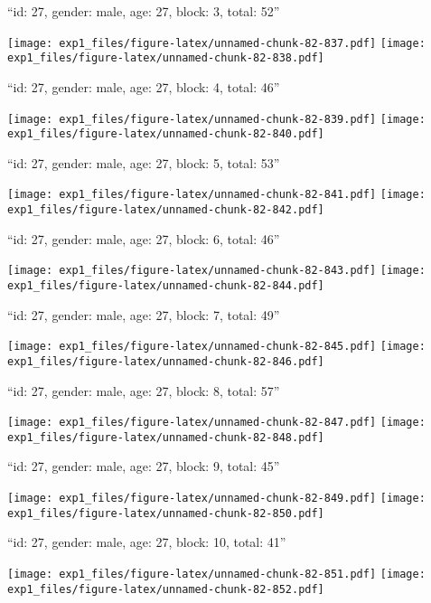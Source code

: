 \documentclass[11pt,,]{article}
\begin{document}
\newpage
[1] 

``id: 27, gender: male, age: 27, block: 3, total: 52''

\texttt{[image: exp1\_files/figure-latex/unnamed-chunk-82-837.pdf]}
\texttt{[image: exp1\_files/figure-latex/unnamed-chunk-82-838.pdf]}

\newpage
[1] 

``id: 27, gender: male, age: 27, block: 4, total: 46''

\texttt{[image: exp1\_files/figure-latex/unnamed-chunk-82-839.pdf]}
\texttt{[image: exp1\_files/figure-latex/unnamed-chunk-82-840.pdf]}

\newpage
[1] 

``id: 27, gender: male, age: 27, block: 5, total: 53''

\texttt{[image: exp1\_files/figure-latex/unnamed-chunk-82-841.pdf]}
\texttt{[image: exp1\_files/figure-latex/unnamed-chunk-82-842.pdf]}

\newpage
[1] 

``id: 27, gender: male, age: 27, block: 6, total: 46''

\texttt{[image: exp1\_files/figure-latex/unnamed-chunk-82-843.pdf]}
\texttt{[image: exp1\_files/figure-latex/unnamed-chunk-82-844.pdf]}

\newpage
[1] 

``id: 27, gender: male, age: 27, block: 7, total: 49''

\texttt{[image: exp1\_files/figure-latex/unnamed-chunk-82-845.pdf]}
\texttt{[image: exp1\_files/figure-latex/unnamed-chunk-82-846.pdf]}

\newpage
[1] 

``id: 27, gender: male, age: 27, block: 8, total: 57''

\texttt{[image: exp1\_files/figure-latex/unnamed-chunk-82-847.pdf]}
\texttt{[image: exp1\_files/figure-latex/unnamed-chunk-82-848.pdf]}

\newpage
[1] 

``id: 27, gender: male, age: 27, block: 9, total: 45''

\texttt{[image: exp1\_files/figure-latex/unnamed-chunk-82-849.pdf]}
\texttt{[image: exp1\_files/figure-latex/unnamed-chunk-82-850.pdf]}

\newpage
[1] 

``id: 27, gender: male, age: 27, block: 10, total: 41''

\texttt{[image: exp1\_files/figure-latex/unnamed-chunk-82-851.pdf]}
\texttt{[image: exp1\_files/figure-latex/unnamed-chunk-82-852.pdf]}
\end{document}
